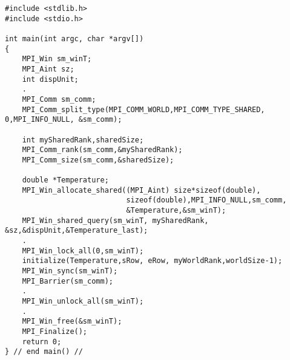 \begin{lstlisting}[style=CStyle]
#include <stdlib.h>
#include <stdio.h>

int main(int argc, char *argv[])
{
    MPI_Win sm_winT;
    MPI_Aint sz;
    int dispUnit;
    .
    MPI_Comm sm_comm;
    MPI_Comm_split_type(MPI_COMM_WORLD,MPI_COMM_TYPE_SHARED, 0,MPI_INFO_NULL, &sm_comm);

    int mySharedRank,sharedSize;
    MPI_Comm_rank(sm_comm,&mySharedRank);
    MPI_Comm_size(sm_comm,&sharedSize);

    double *Temperature;
    MPI_Win_allocate_shared((MPI_Aint) size*sizeof(double),
                            sizeof(double),MPI_INFO_NULL,sm_comm,
                            &Temperature,&sm_winT);
    MPI_Win_shared_query(sm_winT, mySharedRank, &sz,&dispUnit,&Temperature_last);
    .
    MPI_Win_lock_all(0,sm_winT);
    initialize(Temperature,sRow, eRow, myWorldRank,worldSize-1);
    MPI_Win_sync(sm_winT);
    MPI_Barrier(sm_comm);
    .
    MPI_Win_unlock_all(sm_winT);
    .
    MPI_Win_free(&sm_winT);
    MPI_Finalize();
    return 0;
} // end main() //
\end{lstlisting}



\begin{comment}

\begin{outline}
    \item {\bf MPI functions for shared memory }\\
      Description and use of the most relevant functions for shared memory introduced in MPI-3
    \item {\bf Shared Memory Allocation} \\
    Contiguous versus Noncontiguous memory allocation schemes\\
    Advantages and disadvantages\\
    Recommendations
    \item {\bf Relationship to Remote Memory Access }
      \begin{outline}
        \item {\bf Remote Memory Access Windows}
      \end{outline}
    \item {\bf Synchronization Techniques} \\
    Difference between $\textbf{MPI\_Win\_fence()}$ and $\textbf{MPI\_Win\_sync()}$

\end{outline}

\end{comment}

